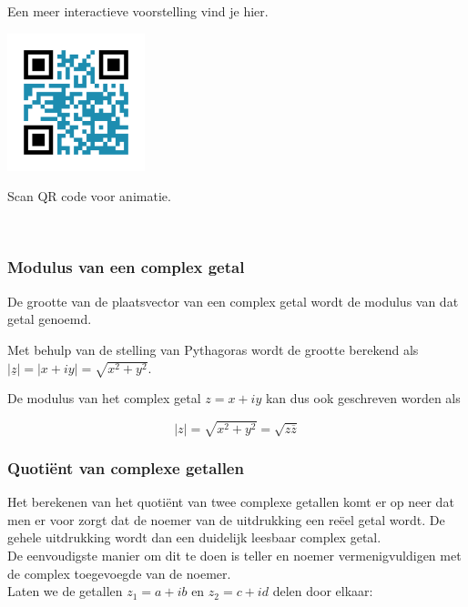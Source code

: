 
Een meer interactieve voorstelling vind je hier.\\

\begin{minipage}{.25\linewidth}
	\raggedright
	\includegraphics[width=4cm]{3_gonio_complexe_getallen/inputs/QR_Code_ANIMATIE3_module3}
\end{minipage}
\begin{minipage}{.7\linewidth}
	Scan QR code voor animatie.
\end{minipage}  \\


\subsubsection{Modulus van een complex getal}

\begin{definitie}
	De grootte van de plaatsvector van een complex getal wordt de modulus van dat getal genoemd. 

\end{definitie}
Met behulp van de stelling van Pythagoras wordt de grootte berekend als $|\underline{z}|=|x+iy|=\sqrt{x^2 +y^2}$.\\
\begin{eigenschap}
	De modulus van het complex getal $z=x+iy$ kan dus ook geschreven worden als

\begin{framed}
\[ |z|=\sqrt{x^2 +y^2}=\sqrt{z \overline{z}}  \]
\end{framed}

\end{eigenschap}

\subsubsection{Quoti\"{e}nt van complexe getallen}

Het berekenen van het quoti\"{e}nt van twee complexe getallen komt er op neer dat men er voor zorgt dat de noemer van de uitdrukking een re\"{e}el getal wordt. De gehele uitdrukking wordt dan een duidelijk leesbaar complex getal.\\
De eenvoudigste manier om dit te doen is teller en noemer vermenigvuldigen met de complex toegevoegde van de noemer.\\
Laten we de getallen $z_{1}=a+ib$ en $z_{2}=c+id$ delen door elkaar:

